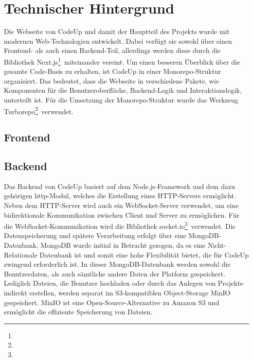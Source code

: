 \documentclass[main.tex]{subfiles}
\begin{document}
    \section{Technischer Hintergrund}
    Die Webseite von CodeUp und damit der Hauptteil des Projekts wurde mit modernen Web-Technologien entwickelt.
    Dabei verfügt sie sowohl über einen Frontend- als auch einen Backend-Teil, allerdings werden diese durch die Bibliothek \dq Next.js\dq \footnote{}\ miteinander vereint.
    Um einen besseren Überblick über die gesamte Code-Basis zu erhalten, ist CodeUp in einer Monorepo-Struktur organisiert.
    Das bedeutet, dass die Webseite in verschiedene Pakete, wie Komponenten für die Benutzeroberfläche, Backend-Logik und Interaktionslogik, unterteilt ist.
    Für die Umsetzung der Monorepo-Struktur wurde das Werkzeug \dq Turborepo\dq \footnote{}\ verwendet.
    \subsection{Frontend}

    \subsection{Backend}
    Das Backend von CodeUp basiert auf dem Node.js-Framework und dem dazu gehörigen \dq http\dq-Modul, welches die Erstellung eines HTTP-Servers ermöglicht.
    Neben dem HTTP-Server wird auch ein WebSocket-Server verwendet, um eine bidirektionale Kommunikation zwischen Client und Server zu ermöglichen.
    Für die WebSocket-Kommunikation wird die Bibliothek \dq socket.io\dq \footnote{}\ verwendet.
    Die Datenspeicherung und spätere Verarbeitung erfolgt über eine MongoDB-Datenbank.
    MongoDB wurde initial in Betracht gezogen, da es eine Nicht-Relationale Datenbank ist und somit eine hohe Flexibilität bietet, die für CodeUp zwingend erforderlich ist.
    In dieser MongoDB-Datenbank werden sowohl die Benutzerdaten, als auch sämtliche andere Daten der Platform gespeichert.
    Lediglich Dateien, die Benutzer hochladen oder durch das Anlegen von Projekte indirekt erstellen, werden separat im S3-kompatiblen Object-Storage MinIO gespeichert.
    MinIO ist eine Open-Source-Alternative zu Amazon S3 und ermöglicht die effiziente Speicherung von Dateien.
\end{document}
